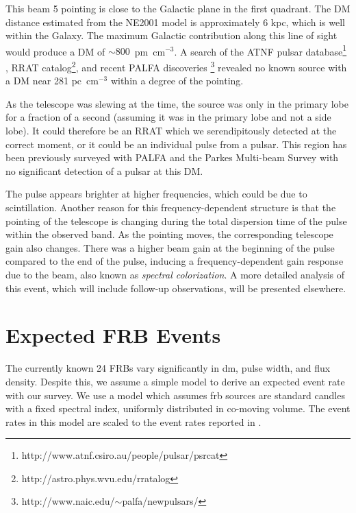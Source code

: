 \documentclass[a4paper,fleqn,usenatbib]{mnras}
\begin{document}
This beam 5 pointing is close to the Galactic plane in the first quadrant. The
DM distance estimated from the NE2001 model \citep{2002astro.ph..7156C} is
approximately 6 kpc, which is well within the Galaxy. The maximum Galactic
contribution along this line of sight would produce a DM of
$\sim800$~pm~cm$^{-3}$.  A search of the ATNF pulsar
database\footnote{http://www.atnf.csiro.au/people/pulsar/psrcat}
\citep{2005AJ....129.1993M}, RRAT
catalog\footnote{http://astro.phys.wvu.edu/rratalog}, and recent PALFA
discoveries \footnote{http://www.naic.edu/$\sim$palfa/newpulsars/} revealed no
known source with a DM near 281 pc~cm$^{-3}$ within a degree of the pointing.

As the telescope was slewing at the time, the source was only in the primary
lobe for a fraction of a second (assuming it was in the primary lobe and not a
side lobe).
It could therefore be an RRAT which we
serendipitously detected at the correct moment, or it could be an individual
pulse from a pulsar. This region has been previously surveyed with PALFA and the
Parkes Multi-beam Survey \citep{2001MNRAS.328...17M} with no significant
detection of a pulsar at this DM.

The pulse appears brighter at higher frequencies, which could be due to
scintillation. Another reason for this frequency-dependent structure is that the
pointing of the telescope is changing during the total dispersion time of the
pulse within the observed band. As the pointing moves, the corresponding
telescope gain also changes.  There was a higher beam gain at the beginning of
the pulse compared to the end of the pulse, inducing a frequency-dependent gain
response due to the beam, also known as \emph{spectral colorization}.  A more
detailed analysis of this event, which will include follow-up observations, will
be presented elsewhere.



\section{Expected FRB Events}
\label{sec:event_rates}

The currently known 24 FRBs vary significantly in \gls{dm}, pulse
width, and flux density. Despite this, we assume a simple model to
derive an expected event rate with our survey.  We use a model
\citep{2013MNRAS.436L...5L} which assumes \gls{frb} sources are
standard candles with a fixed spectral index, uniformly distributed in
co-moving volume. The event rates in this model are scaled to the
event rates reported in \cite{2013Sci...341...53T}. 
\end{document}
